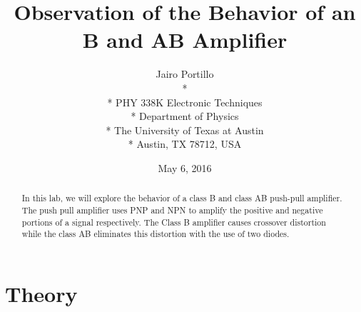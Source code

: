 \documentclass[11pt,letterpaper,onecolumn]{article}
\begin{document}

\title{\bf Observation of the Behavior of an B and AB Amplifier}

\author{
 Jairo Portillo \\*
  \\*
 PHY 338K Electronic Techniques \\*
 Department of Physics \\*
 The University of Texas at Austin \\*
 Austin, TX 78712, USA
}
\date{May 6, 2016}


\maketitle


\begin{abstract}

In this lab, we will explore the behavior of a class B and class AB push-pull amplifier. The push pull amplifier uses PNP and NPN to amplify the positive and negative portions of a signal respectively. The Class B amplifier causes crossover distortion while the class AB eliminates this distortion with the use of  two diodes.

\end{abstract}



\section{Theory}
\end{document}
